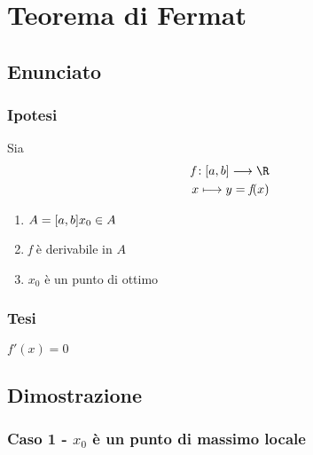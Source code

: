 \documentclass[../dimostrazioni]{subfiles}
\begin{document}
    \chapter{Teorema di Fermat}

        \section*{Enunciato}

        \subsection{Ipotesi}

        Sia \begin{align*} \textit{f} : [a, b] \longrightarrow \R\\
                                           x   \longmapsto     y = \textit{f}(x) 
            \end{align*}
        
        \begin{enumerate}
            \item \(A = [a, b]\\x_0 \in A\)
            \item \textit{f} è derivabile in \(A\)
            \item \(x_0\) è un punto di ottimo
        \end{enumerate}

        \subsection{Tesi}

        \(\textit{f}'(x) = 0\)

        \section*{Dimostrazione}

            \medskip

            \subsection{Caso 1 - \(x_0\) è un punto di massimo locale}

            
    

    
\end{document}
